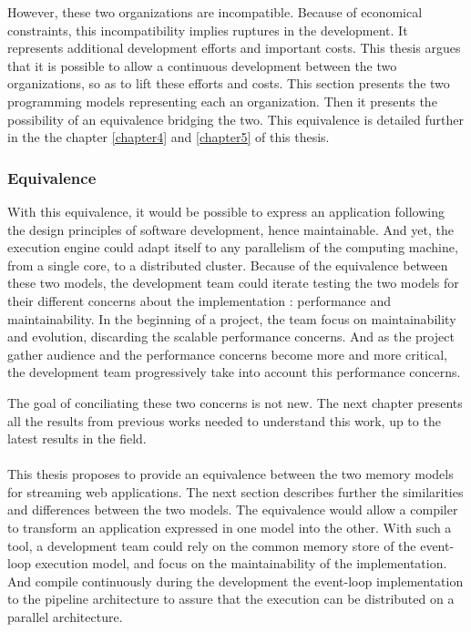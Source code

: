 However, these two organizations are incompatible.
Because of economical constraints, this incompatibility implies ruptures in the development.
It represents additional development efforts and important costs.
This thesis argues that it is possible to allow a continuous development between the two organizations, so as to lift these efforts and costs.
This section presents the two programming models representing each an organization.
Then it presents the possibility of an equivalence bridging the two.
This equivalence is detailed further in the the chapter \ref{chapter4} and \ref{chapter5} of this thesis.

\subsubsection{Equivalence}

With this equivalence, it would be possible to express an application following the design principles of software development, hence maintainable.
And yet, the execution engine could adapt itself to any parallelism of the computing machine, from a single core, to a distributed cluster.
Because of the equivalence between these two models, the development team could iterate testing the two models for their different concerns about the implementation : performance and maintainability.
In the beginning of a project, the team focus on maintainability and evolution, discarding the scalable performance concerns.
And as the project gather audience and the performance concerns become more and more critical, the development team progressively take into account this performance concerns.

The goal of conciliating these two concerns is not new.
The next chapter presents all the results from previous works needed to understand this work, up to the latest results in the field.

\paragraph{}

This thesis proposes to provide an equivalence between the two memory models for streaming web applications.
The next section describes further the similarities and differences between the two models.
The equivalence would allow a compiler to transform an application expressed in one model into the other.
With such a tool, a development team could rely on the common memory store of the event-loop execution model, and focus on the maintainability of the implementation.
And compile continuously during the development the event-loop implementation to the pipeline architecture to assure that the execution can be distributed on a parallel architecture.